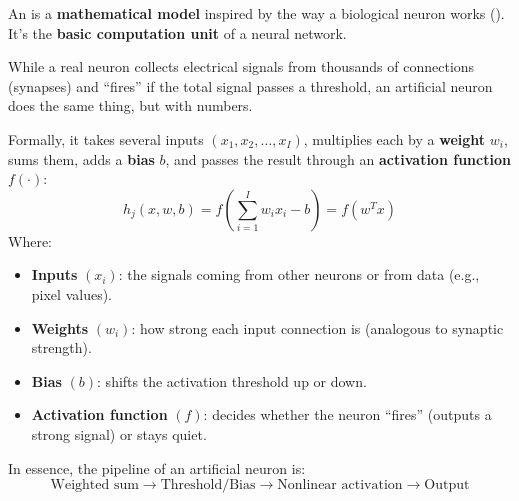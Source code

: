 \begin{definitionbox}\label{def:artificial-neuron}
    An  is a \textbf{mathematical model} inspired by the way a biological neuron works (). It's the \textbf{basic computation unit} of a neural network.

    \highspace
    While a real neuron collects electrical signals from thousands of connections (synapses) and ``fires'' if the total signal passes a threshold, an artificial neuron does the same thing, but with numbers.

    \highspace
    Formally, it takes several inputs $\left(x_1, x_2, \ldots, x_I\right)$, multiplies each by a \textbf{weight} $w_i$, sums them, adds a \textbf{bias} $b$, and passes the result through an \textbf{activation function} $f(\cdot)$:
    \begin{equation}
        h_{j}\left(x, w, b\right) = f\left(\sum_{i=1}^{I} w_{i} x_{i} - b\right) = f\left(w^{T} x\right)
    \end{equation}
    Where:
    \begin{itemize}
        \item \textbf{Inputs} $\left(x_i\right)$: the signals coming from other neurons or from data (e.g., pixel values).
        \item \textbf{Weights} $\left(w_i\right)$: how strong each input connection is (analogous to synaptic strength).
        \item \textbf{Bias} $\left(b\right)$: shifts the activation threshold up or down.
        \item \textbf{Activation function} $\left(f\right)$: decides whether the neuron ``fires'' (outputs a strong signal) or stays quiet.
    \end{itemize}
    In essence, the pipeline of an artificial neuron is:
    \begin{equation*}
        \text{Weighted sum} \rightarrow \text{Threshold/Bias} \rightarrow \text{Nonlinear activation} \rightarrow \text{Output}
    \end{equation*}
\end{definitionbox}

